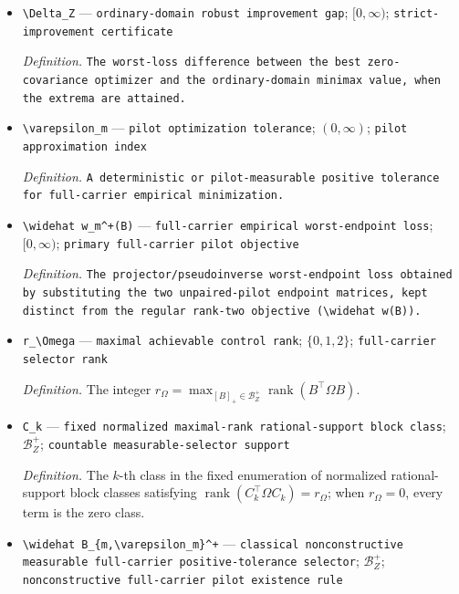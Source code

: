 \documentclass{article}
\begin{document}
\begin{itemize}
  \item \texttt{\textbackslash{}\allowbreak{}Delta\_\allowbreak{}Z} --- \texttt{ordinary-\allowbreak{}domain robust improvement gap}; \([0,\infty)\); \texttt{strict-\allowbreak{}improvement certificate}
  \par\smallskip\noindent\emph{Definition.} \texttt{The worst-\allowbreak{}loss difference between the best zero-\allowbreak{}covariance optimizer and the ordinary-\allowbreak{}domain minimax value,\allowbreak{} when the extrema are attained.}
  \item \texttt{\textbackslash{}\allowbreak{}varepsilon\_\allowbreak{}m} --- \texttt{pilot optimization tolerance}; \((0,\infty)\); \texttt{pilot approximation index}
  \par\smallskip\noindent\emph{Definition.} \texttt{A deterministic or pilot-\allowbreak{}measurable positive tolerance for full-\allowbreak{}carrier empirical minimization.}
  \item \texttt{\textbackslash{}\allowbreak{}widehat w\_\allowbreak{}m\textasciicircum{}+\allowbreak{}(B)} --- \texttt{full-\allowbreak{}carrier empirical worst-\allowbreak{}endpoint loss}; \([0,\infty)\); \texttt{primary full-\allowbreak{}carrier pilot objective}
  \par\smallskip\noindent\emph{Definition.} \texttt{The projector/\allowbreak{}pseudoinverse worst-\allowbreak{}endpoint loss obtained by substituting the two unpaired-\allowbreak{}pilot endpoint matrices,\allowbreak{} kept distinct from the regular rank-\allowbreak{}two objective (\textbackslash{}\allowbreak{}widehat w(B)).}
  \item \texttt{r\_\allowbreak{}\textbackslash{}\allowbreak{}Omega} --- \texttt{maximal achievable control rank}; \(\{0,1,2\}\); \texttt{full-\allowbreak{}carrier selector rank}
  \par\smallskip\noindent\emph{Definition.} The integer \(r_\Omega=\max_{[B]_+\in\mathcal B_Z^+}\operatorname{rank}(B^{\top}\Omega B)\).
  \item \texttt{C\_\allowbreak{}k} --- \texttt{fixed normalized maximal-\allowbreak{}rank rational-\allowbreak{}support block class}; \(\mathcal B_Z^+\); \texttt{countable measurable-\allowbreak{}selector support}
  \par\smallskip\noindent\emph{Definition.} The \(k\)-th class in the fixed enumeration of normalized rational-support block classes satisfying \(\operatorname{rank}(C_k^{\top}\Omega C_k)=r_\Omega\); when \(r_\Omega=0\), every term is the zero class.
  \item \texttt{\textbackslash{}\allowbreak{}widehat B\_\allowbreak{}\{m,\allowbreak{}\textbackslash{}\allowbreak{}varepsilon\_\allowbreak{}m\}\allowbreak{}\textasciicircum{}+\allowbreak{}} --- \texttt{classical nonconstructive measurable full-\allowbreak{}carrier positive-\allowbreak{}tolerance selector}; \(\mathcal B_Z^+\); \texttt{nonconstructive full-\allowbreak{}carrier pilot existence rule}

\end{itemize}
\end{document}
